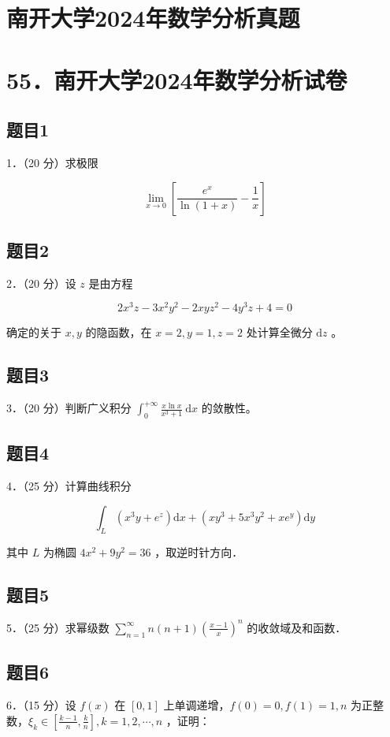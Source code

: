 \documentclass{article}
\begin{document}
\section*{南开大学2024年数学分析真题}
\section*{55．南开大学2024年数学分析试卷}

\subsection{题目1}
1．（20 分）求极限

\[
\lim _{x \rightarrow 0}\left[\frac{e^{x}}{\ln (1+x)}-\frac{1}{x}\right]
\]

\subsection{题目2}
2．（20 分）设 \(z\) 是由方程

\[
2 x^{3} z-3 x^{2} y^{2}-2 x y z^{2}-4 y^{3} z+4=0
\]

确定的关于 \(x, y\) 的隐函数，在 \(x=2, y=1, z=2\) 处计算全微分 \(\mathrm{d} z\) 。

\subsection{题目3}
3．（20 分）判断广义积分 \(\int_{0}^{+\infty} \frac{x \ln x}{x^{3}+1} \mathrm{~d} x\) 的敛散性。

\subsection{题目4}
4．（25 分）计算曲线积分

\[
\int_{L}\left(x^{3} y+e^{z}\right) \mathrm{d} x+\left(x y^{3}+5 x^{3} y^{2}+x e^{y}\right) \mathrm{d} y
\]

其中 \(L\) 为椭圆 \(4 x^{2}+9 y^{2}=36\) ，取逆时针方向．

\subsection{题目5}
5．（25 分）求幂级数 \(\sum_{n=1}^{\infty} n(n+1)\left(\frac{x-1}{x}\right)^{n}\) 的收敛域及和函数．

\subsection{题目6}
6．（15 分）设 \(f(x)\) 在 \([0,1]\) 上单调递增，\(f(0)=0, f(1)=1, n\) 为正整数，\(\xi_{k} \in\left[\frac{k-1}{n}, \frac{k}{n}\right], k=1,2, \cdots, n\) ，证明：
\end{document}
